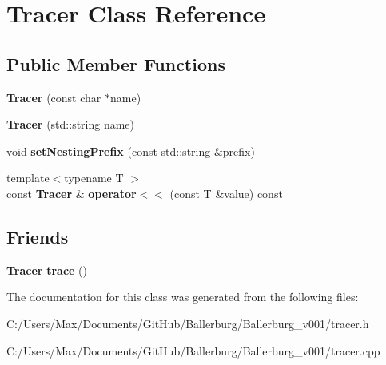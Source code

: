 \section{Tracer Class Reference}
\label{class_tracer}
\subsection*{Public Member Functions}
\begin{DoxyCompactItemize}
\item 
{\bfseries Tracer} (const char $\ast$name)\label{class_tracer_ab5f76eb2148eb92a6da5d72c61cb5005}

\item 
{\bfseries Tracer} (std\+::string name)\label{class_tracer_a4f325d324556b69e2897d0b137b70e99}

\item 
void {\bfseries set\+Nesting\+Prefix} (const std\+::string \&prefix)\label{class_tracer_a83ec129e27aed135efaeb395f9984641}

\item 
{\footnotesize template$<$typename T $>$ }\\const {\bf Tracer} \& {\bfseries operator$<$$<$} (const T \&value) const \label{class_tracer_ad94e93b9f930cd450c4f6bb0165de306}

\end{DoxyCompactItemize}
\subsection*{Friends}
\begin{DoxyCompactItemize}
\item 
{\bf Tracer} {\bfseries trace} ()\label{class_tracer_aba74df155ca9fabb2e45947113f50944}

\end{DoxyCompactItemize}


The documentation for this class was generated from the following files\+:\begin{DoxyCompactItemize}
\item 
C\+:/\+Users/\+Max/\+Documents/\+Git\+Hub/\+Ballerburg/\+Ballerburg\+\_\+v001/tracer.\+h\item 
C\+:/\+Users/\+Max/\+Documents/\+Git\+Hub/\+Ballerburg/\+Ballerburg\+\_\+v001/tracer.\+cpp\end{DoxyCompactItemize}
